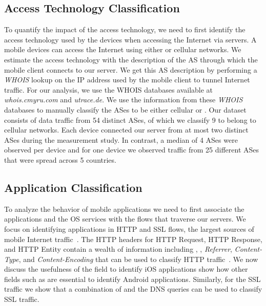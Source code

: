 \subsection{Access Technology Classification}

To quantify the impact of the access technology, we need to first
identify the access technology used by the devices when accessing the
Internet via \platname servers.  A mobile devices can access the
Internet using either \wifi or cellular networks.  We estimate the
access technology with the description of the AS through which the
mobile client connects to our \platname server.  We get this AS
description by performing a \emph{WHOIS} lookup on the IP address used
by the mobile client to tunnel Internet traffic.  For our analysis, we
use the WHOIS databases available at \emph{whois.cmyru.com} and
\emph{utrace.de}.  We use the information from these \emph{WHOIS}
databases to manually classify the ASes to be either cellular or
\wifi.  Our dataset consists of data traffic from 54 distinct ASes, of
which we classify 9 to belong to cellular networks.  Each device
connected our \platname server from at most two distinct ASes during
the measurement study.  In contrast, a median of 4 \wifi ASes were
observed per device and for one device we observed traffic from 25
different \wifi ASes that were spread across 5 countries.

\subsection{Application Classification}

To analyze the behavior of mobile applications we need to first
associate the applications and the OS services with the flows that
traverse our \platname servers.  We focus on identifying applications
in HTTP and SSL flows, the largest sources of mobile Internet
traffic~\cite{maier:mobtraffic,falaki:mobileusage,xu:appusage}.  The
HTTP headers for HTTP Request, HTTP Response, and HTTP Entity contain
a wealth of information including \useragent, \httphost,
\emph{Referrer}, \emph{Content-Type}, and \emph{Content-Encoding} that
can be used to classify HTTP traffic~\cite{rfc:http}.  We now discuss
the usefulness of the \useragent field to identify iOS applications
show how other fields such as \httphost are essential to identify
Android applications.  Similarly, for the SSL traffic we show that a
combination of \sslservername and the DNS queries can be used to
classify SSL traffic.

